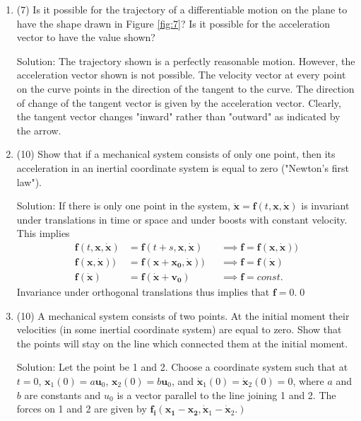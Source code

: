 \begin{enumerate}
\item (7) Is it possible for the trajectory of a differentiable motion on the plane to have the shape drawn in Figure \ref{fig:7}? Is it possible for the acceleration
vector to have the value shown?\par
Solution: The trajectory shown is a perfectly reasonable motion. However, the acceleration vector shown is not possible. The velocity vector at every point on the curve points in the direction of the tangent to the curve.
The direction of change of the tangent vector is given by the acceleration vector. Clearly, the tangent vector changes "inward" rather than "outward" as indicated by the arrow.
\item (10) Show that if a mechanical system consists of only one point, then
its acceleration in an inertial coordinate system is equal to zero ("Newton's
first law").\par
Solution: If there is only one point  in the system, $\ddot{\mathbf{x}} = \mathbf{f}(t, \mathbf{x},\dot{\mathbf{x}})$ is invariant under translations in time or space and under boosts with constant velocity. This implies \begin{align}\label{key}
	\mathbf{f}(t, \mathbf{x},\dot{\mathbf{x}}) &= \mathbf{f}(t+s, \mathbf{x},\dot{\mathbf{x}})&&\implies  \mathbf{f} = \mathbf{f}(\mathbf{x},\dot{\mathbf{x}}))\\
	\mathbf{f}(\mathbf{x},\dot{\mathbf{x}}))& = 	\mathbf{f}(\mathbf{x}+\mathbf{x_0},\dot{\mathbf{x}}))&&\implies  \mathbf{f} = \mathbf{f}(\dot{\mathbf{x}})\\
	\mathbf{f}(\dot{\mathbf{x}})& = \mathbf{f}(\dot{\mathbf{x}}+\mathbf{v_0}) &&\implies \mathbf{f} = const.
\end{align}
Invariance under orthogonal translations thus implies that $ \mathbf{f} = 0 $.\qed
\item (10) A mechanical system consists of two points. At the initial moment
their velocities (in some inertial coordinate system) are equal to zero. Show
that the points will stay on the line which connected them at the initial
moment.\par
Solution: Let the point be 1 and 2. Choose a coordinate system such that at $t = 0$, $\mathbf{x}_1(0) = a \mathbf{u}_0$, $\mathbf{x}_2(0) = b \mathbf{u}_0$, and $\mathbf{\dot{x}}_1(0) = \mathbf{\dot{x}}_2(0)=0$, where $a$ and $b$ are constants and $u_0$ is a vector parallel to the line joining 1 and 2. The forces on 1 and 2 are given by $\mathbf{f_i}(\mathbf{x_1}-\mathbf{x_2}, \mathbf{\dot{x}}_1-\mathbf{\dot{x}}_2.)$\par

\end{enumerate}
